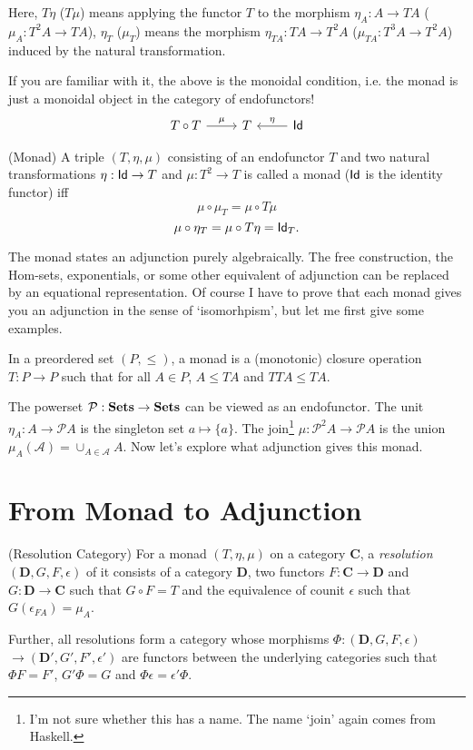 Here, $T\eta$ ($T\mu$) means applying the functor $T$ to the morphism 
$\eta_A:A\to TA$ ($\mu_A: T^2A\to TA$), $\eta_T$ ($\mu_T$) means the 
morphism $\eta_{TA}:TA\to T^2A$ ($\mu_{TA}:T^3A\to T^2A$)
induced by the natural transformation. 

\null

If you are familiar with it, the above is the monoidal condition, i.e.
the monad is just a monoidal object in the category of endofunctors!
$$
\begin{tikzcd}
    T\circ T \arrow{r}{\mu} & T & \Id \arrow[swap]{l}{\eta}
\end{tikzcd}
$$

\begin{definition}
    (Monad) A triple $(T,\eta,\mu)$ consisting of an endofunctor $T$
    and two natural transformations $\eta:\text{\sf Id}\to T$ and $\mu:T^2\to T$
    is called a monad ($\text{\sf Id}$ is the identity functor) iff 
    $$
        \mu\circ\mu_T=\mu\circ T\mu
    $$
    $$
        \mu\circ\eta_T=\mu\circ T\eta=\text{\sf Id}_T.
    $$
\end{definition}

The monad states an adjunction purely algebraically. The free 
construction, the Hom-sets, exponentials, or some other equivalent of 
adjunction can be replaced by an equational representation. Of course
I have to prove that each monad gives you an adjunction in the sense
of `isomorhpism', but let me first give some examples. 

\bigskip
In a preordered set $(P,\le)$, a monad is a (monotonic) closure 
operation $T:P\to P$ such that for all $A\in P$, $A\le TA$ and 
$TTA\le TA$. \bigskip

\newcommand{\powerset}{\mathcal{P}}
The powerset $\powerset: \Sets\to\Sets$ can be viewed as an endofunctor. 
The unit $\eta_A:A\to\powerset A$ is the singleton set $a\mapsto \{a\}$. 
The join\footnote{I'm not sure whether this has a name. The name `join'
again comes from Haskell.} $\mu:\powerset^2 A\to \powerset A$ is the
union $\mu_A(\mathscr{A})=\cup_{A\in\mathscr{A}}A$. Now let's explore
what adjunction gives this monad. 

\newcommand{\cat}{\mathbf}

\section{From Monad to Adjunction}
\begin{definition}(Resolution Category)
    For a monad $(T,\eta,\mu)$ on a category $\cat{C}$, a
    {\it resolution} $(\cat{D},G,F,\epsilon)$ of it consists
    of a category $\cat{D}$, two functors $F:\cat{C}\to\cat{D}$
    and $G:\cat{D}\to\cat{C}$ such that $G\circ F=T$ and the
    equivalence of counit $\epsilon$ such that $G(\epsilon_{FA})=\mu_A$.
    
    Further, all resolutions form a category whose morphisms
    $\Phi:(\cat{D},G,F,\epsilon)$ $\to(\cat{D'},G',F',\epsilon')$ are 
    functors between the underlying categories such that $\Phi F=F'$,
    $G'\Phi=G$ and $\Phi\epsilon=\epsilon'\Phi$.
\end{definition}

